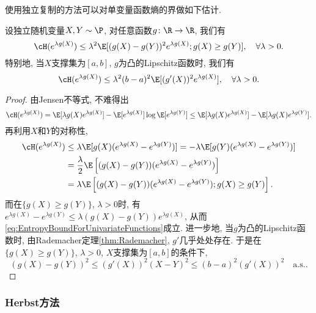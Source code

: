 使用独立复制的方法可以对单变量函数熵的界做如下估计. 
\begin{lemma}[单变量函数熵的界]\label{lemma:EntropyBoundForUnivariateFunctions}
	设独立随机变量$X, Y \sim \P$, 对任意函数$g \colon \R \to \R$, 我们有
	\begin{equation}\label{eq:EntropyBoundForUnivariateFunctions}
		\cH(e^{\lambda g(X)})
		\leq \lambda^2 \E[ (g(X) - g(Y))^2 e^{\lambda g(X)}; g(X) \geq g(Y) ], \quad \forall \lambda > 0.
	\end{equation}
	特别地, 当$X$支撑集为$[a, b]$, $g$为凸的Lipschitz函数时, 我们有
	\begin{equation*}
		\cH(e^{\lambda g(X)}) 
		\leq \lambda^2 (b-a)^2 \E[(g'(X))^2 e^{\lambda g(X)}], \quad \forall \lambda > 0.
	\end{equation*}
\end{lemma}
\begin{proof}
	由Jensen不等式, 不难得出
	\begin{equation*}
		\cH(e^{\lambda g(X)})
		= \E[\lambda g(X) e^{\lambda g(X)}] - \E[e^{\lambda g(X)}] \log \E[e^{\lambda g(Y)}] 
		\leq \E[\lambda g(X) e^{\lambda g(X)}] - \E[\lambda g(X) e^{\lambda g(Y)}].
	\end{equation*}
	再利用$X$和$Y$的对称性, 
	\begin{align*}
		\cH(e^{\lambda g(X)})
		&\leq \lambda \E[ g(X) (e^{\lambda g(X)}-  e^{\lambda g(Y)})] 
		= - \lambda \E[ g(Y) (e^{\lambda g(X)}-  e^{\lambda g(Y)})] \\
		&= \frac{\lambda}{2} \E\left[(g(X) - g(Y)) (e^{\lambda g(X)} - e^{\lambda g(Y)})\right] \\
		&= \lambda \E\left[(g(X) - g(Y)) (e^{\lambda g(X)} - e^{\lambda g(Y)}); g(X) \geq g(Y) \right].
	\end{align*}
	而在$\{g(X) \geq g(Y)\}$, $\lambda > 0$时, 有$e^{\lambda g(X)} - e^{\lambda g(Y)} \leq \lambda(g(X) - g(Y)) e^{\lambda g(X)}$, 从而\eqref{eq:EntropyBoundForUnivariateFunctions}成立. 
	进一步地, 当$g$为凸的Lipschitz函数时, 由Rademacher定理\ref{thm:Rademacher}, $g'$几乎处处存在. 
	于是在$\{g(X) \geq g(Y)\}$, $\lambda > 0$, $X$支撑集为$[a, b]$的条件下,
	\begin{equation*}
		(g(X) - g(Y))^2 \leq (g'(X))^2 (X-Y)^2 \leq (b-a)^2 (g'(X))^2 \quad \text{a.s.}.
	\end{equation*}
\end{proof}

\subsubsection{Herbst方法}

